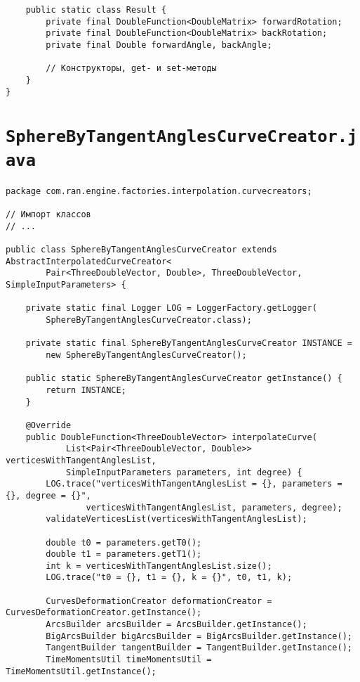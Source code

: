 \begin{verbatim}
    public static class Result {
        private final DoubleFunction<DoubleMatrix> forwardRotation;
        private final DoubleFunction<DoubleMatrix> backRotation;
        private final Double forwardAngle, backAngle;

        // Конструкторы, get- и set-методы
    }
}
\end{verbatim}

\section*{\texttt{SphereByTangentAnglesCurveCreator.java}}
\begin{verbatim}
package com.ran.engine.factories.interpolation.curvecreators;

// Импорт классов
// ...

public class SphereByTangentAnglesCurveCreator extends AbstractInterpolatedCurveCreator<
        Pair<ThreeDoubleVector, Double>, ThreeDoubleVector, SimpleInputParameters> {

    private static final Logger LOG = LoggerFactory.getLogger(
        SphereByTangentAnglesCurveCreator.class);

    private static final SphereByTangentAnglesCurveCreator INSTANCE =
        new SphereByTangentAnglesCurveCreator();

    public static SphereByTangentAnglesCurveCreator getInstance() {
        return INSTANCE;
    }

    @Override
    public DoubleFunction<ThreeDoubleVector> interpolateCurve(
            List<Pair<ThreeDoubleVector, Double>> verticesWithTangentAnglesList,
            SimpleInputParameters parameters, int degree) {
        LOG.trace("verticesWithTangentAnglesList = {}, parameters = {}, degree = {}",
                verticesWithTangentAnglesList, parameters, degree);
        validateVerticesList(verticesWithTangentAnglesList);

        double t0 = parameters.getT0();
        double t1 = parameters.getT1();
        int k = verticesWithTangentAnglesList.size();
        LOG.trace("t0 = {}, t1 = {}, k = {}", t0, t1, k);

        CurvesDeformationCreator deformationCreator = CurvesDeformationCreator.getInstance();
        ArcsBuilder arcsBuilder = ArcsBuilder.getInstance();
        BigArcsBuilder bigArcsBuilder = BigArcsBuilder.getInstance();
        TangentBuilder tangentBuilder = TangentBuilder.getInstance();
        TimeMomentsUtil timeMomentsUtil = TimeMomentsUtil.getInstance();


\end{verbatim}
